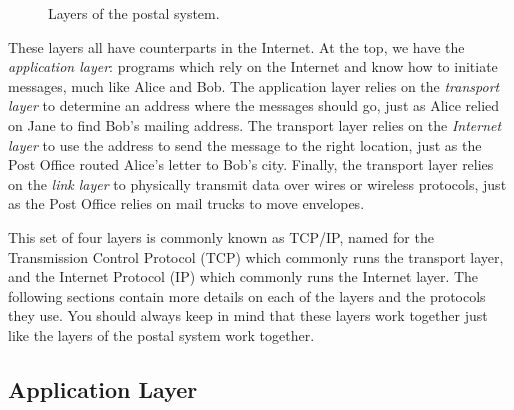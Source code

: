 \begin{figure}
    \centering
    \caption{Layers of the postal system.}
    \label{fig:layer_mail}
\end{figure}

These layers all have counterparts in the Internet. At the top, we have the \emph{application layer}: programs which rely on the Internet and know how to initiate messages, much like Alice and Bob. The application layer relies on the \emph{transport layer} to determine an address where the messages should go, just as Alice relied on Jane to find Bob's mailing address. The transport layer relies on the \emph{Internet layer} to use the address to send the message to the right location, just as the Post Office routed Alice's letter to Bob's city. Finally, the transport layer relies on the \emph{link layer} to physically transmit data over wires or wireless protocols, just as the Post Office relies on mail trucks to move envelopes.

This set of four layers is commonly known as TCP/IP, named for the Transmission Control Protocol (TCP) which commonly runs the transport layer, and the Internet Protocol (IP) which commonly runs the Internet layer. The following sections contain more details on each of the layers and the protocols they use. You should always keep in mind that these layers work together just like the layers of the postal system work together.

\subsection{Application Layer}

